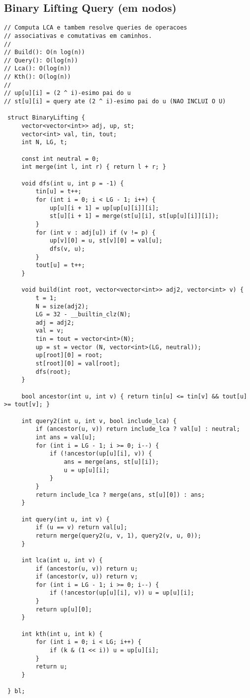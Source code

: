 \documentclass[11pt, a4paper, twoside]{article}
\begin{document}
\subsection{Binary Lifting Query (em nodos)}
\begin{lstlisting}
// Computa LCA e tambem resolve queries de operacoes
// associativas e comutativas em caminhos.
//
// Build(): O(n log(n))
// Query(): O(log(n))
// Lca(): O(log(n))
// Kth(): O(log(n))
//
// up[u][i] = (2 ^ i)-esimo pai do u
// st[u][i] = query ate (2 ^ i)-esimo pai do u (NAO INCLUI O U)

 struct BinaryLifting {
     vector<vector<int>> adj, up, st;
     vector<int> val, tin, tout;
     int N, LG, t;
 
     const int neutral = 0;
     int merge(int l, int r) { return l + r; }
 
     void dfs(int u, int p = -1) {
         tin[u] = t++;
         for (int i = 0; i < LG - 1; i++) {
             up[u][i + 1] = up[up[u][i]][i];
             st[u][i + 1] = merge(st[u][i], st[up[u][i]][i]);
         }
         for (int v : adj[u]) if (v != p) {
             up[v][0] = u, st[v][0] = val[u];
             dfs(v, u);
         }
         tout[u] = t++;
     }
 
     void build(int root, vector<vector<int>> adj2, vector<int> v) {
         t = 1;
         N = size(adj2);
         LG = 32 - __builtin_clz(N);
         adj = adj2;
         val = v;
         tin = tout = vector<int>(N);
         up = st = vector (N, vector<int>(LG, neutral));
         up[root][0] = root;
         st[root][0] = val[root];
         dfs(root);
     }
 
     bool ancestor(int u, int v) { return tin[u] <= tin[v] && tout[u] >= tout[v]; }
 
     int query2(int u, int v, bool include_lca) {
         if (ancestor(u, v)) return include_lca ? val[u] : neutral;
         int ans = val[u];
         for (int i = LG - 1; i >= 0; i--) {
             if (!ancestor(up[u][i], v)) {
                 ans = merge(ans, st[u][i]);
                 u = up[u][i];
             }
         }
         return include_lca ? merge(ans, st[u][0]) : ans;
     }
 
     int query(int u, int v) {
         if (u == v) return val[u];
         return merge(query2(u, v, 1), query2(v, u, 0));
     }
 
     int lca(int u, int v) {
         if (ancestor(u, v)) return u;
         if (ancestor(v, u)) return v;
         for (int i = LG - 1; i >= 0; i--) {
             if (!ancestor(up[u][i], v)) u = up[u][i];
         }
         return up[u][0];
     }
 
     int kth(int u, int k) {
         for (int i = 0; i < LG; i++) {
             if (k & (1 << i)) u = up[u][i];
         }
         return u;
     }
 
 } bl;
\end{lstlisting}
\end{document}

